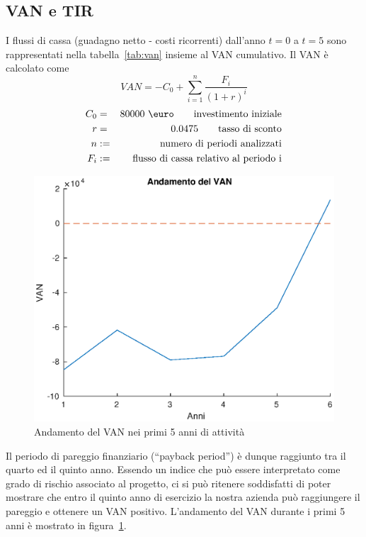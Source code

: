 \subsection{VAN e TIR}
I flussi di cassa (guadagno netto - costi ricorrenti) dall’anno $t=0$ a $t=5$ sono
rappresentati nella tabella~\ref{tab:van} insieme al VAN cumulativo.
Il VAN è calcolato come 	
\begin{displaymath}
VAN = - C_0 + \sum_{i=1}^n \frac{F_i}{(1 + r)^i}
\end{displaymath}
\begin{eqnarray*}
C_0 &=& 80000 \ \mbox{\euro} \qquad \mbox{investimento iniziale} \\
r &=& 0.0475 \qquad \mbox{tasso di sconto} \\
n &:=& \mbox{numero di periodi analizzati} \\
F_i &:=& \mbox{flusso di cassa relativo al periodo i}
\end{eqnarray*}

%
\begin{figure}[!h]
\centering
\includegraphics[width=\textwidth]{figures/van}
\caption{Andamento del VAN nei primi 5 anni di attività}
\label{van}
\end{figure}
%
Il periodo di pareggio finanziario (“payback period”) è dunque raggiunto tra il
quarto ed il quinto anno. Essendo un indice che può essere interpretato come
grado di rischio associato al progetto, ci si può ritenere soddisfatti di poter
mostrare che entro il quinto anno di esercizio la nostra azienda può raggiungere
il pareggio e ottenere un VAN positivo. L'andamento del VAN durante i primi 5
anni è mostrato in figura~\ref{van}.

